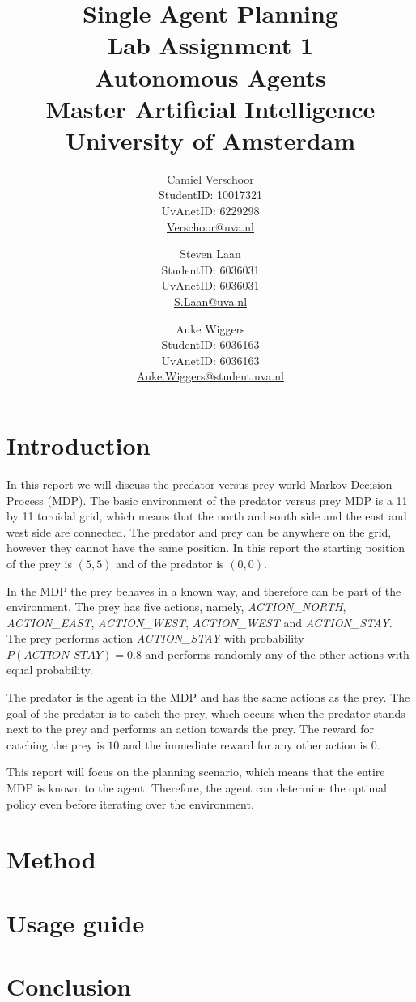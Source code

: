 \documentclass[a4paper]{article}
\title{Single Agent Planning\\\large Lab Assignment 1\\Autonomous Agents\\Master Artificial Intelligence\\University of Amsterdam}
\author{Camiel Verschoor\\StudentID: 10017321\\UvAnetID: 6229298\\ \url{Verschoor@uva.nl} \and Steven Laan\\StudentID: 6036031\\UvAnetID: 6036031\\\url{S.Laan@uva.nl} \and Auke Wiggers\\StudentID: 6036163\\UvAnetID: 6036163\\\url{Auke.Wiggers@student.uva.nl}}
\begin{document}
\maketitle

\section{Introduction}
In this report we will discuss the predator versus prey world Markov Decision Process (MDP). The basic environment of the predator versus prey MDP is a 11 by 11 toroidal grid, which means that the north and south side and the east and west side are connected. The predator and prey can be anywhere on the grid, however they cannot have the same position. In this report the starting position of the prey is $(5, 5)$ and of the predator is $(0,0)$.

In the MDP the prey behaves in a known way, and therefore can be part of the environment. The prey has five actions, namely, \textit{ACTION\_NORTH}, \textit{ACTION\_EAST}, \textit{ACTION\_WEST}, \textit{ACTION\_WEST} and \textit{ACTION\_STAY}. The prey performs action \textit{ACTION\_STAY} with probability $P(ACTION\_STAY) = 0.8$ and performs randomly any of the other actions with equal probability.

The predator is the agent in the MDP and has the same actions as the prey. The goal of the predator is to catch the prey, which occurs when the predator stands next to the prey and performs an action towards the prey. The reward for catching the prey is $10$ and the immediate reward for any other action is $0$.

This report will focus on the planning scenario, which means that the entire MDP is known to the agent. Therefore, the agent can determine the optimal policy even before iterating over the environment.
\section{Method}

\section{Usage guide}

\section{Conclusion}
\end{document}
